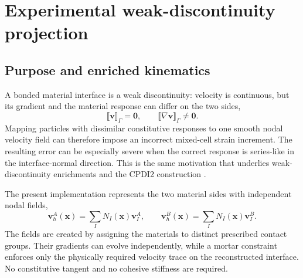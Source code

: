 \section{Experimental weak-discontinuity projection}
\label{sec:weak-trace-implementation}

\noindent{}\par\medskip

\subsection{Purpose and enriched kinematics}

A bonded material interface is a weak discontinuity: velocity is continuous,
but its gradient and the material response can differ on the two sides,
\begin{equation}
  \llbracket \mathbf{v} \rrbracket_\Gamma = \mathbf{0},
  \qquad
  \llbracket \nabla \mathbf{v} \rrbracket_\Gamma \ne \mathbf{0}.
  \label{eq:weak-trace-weak-discontinuity}
\end{equation}
Mapping particles with dissimilar constitutive responses to one smooth nodal
velocity field can therefore impose an incorrect mixed-cell strain increment.
The resulting error can be especially severe when the correct response is
series-like in the interface-normal direction.  This is the same motivation
that underlies weak-discontinuity enrichments and the CPDI2 construction
\cite{crook2025cohesive,sadeghirad2013cpdi2}.

The present implementation represents the two material sides with independent
nodal fields,
\begin{equation}
  \mathbf{v}_h^A(\mathbf{x}) = \sum_I N_I(\mathbf{x})\mathbf{v}_I^A,
  \qquad
  \mathbf{v}_h^B(\mathbf{x}) = \sum_I N_I(\mathbf{x})\mathbf{v}_I^B.
  \label{eq:weak-trace-two-fields}
\end{equation}
The fields are created by assigning the materials to distinct prescribed
contact groups.  Their gradients can evolve independently, while a mortar
constraint enforces only the physically required velocity trace on the
reconstructed interface.  No constitutive tangent and no cohesive stiffness
are required.

